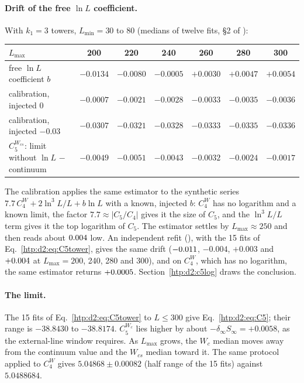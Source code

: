 \paragraph{Drift of the free $\ln L$ coefficient.} With $k_1=3$ towers, $L_{\min}=30$ to 80 (medians of twelve fits,
\S2 of ):
\begin{center}\footnotesize\renewcommand{\arraystretch}{1.15}
\begin{tabular}{@{}lcccccc@{}}
\toprule
$L_{\max}$ & 200 & 220 & 240 & 260 & 280 & 300 \\\midrule
free $\ln L$ coefficient $b$ & $-0.0134$ & $-0.0080$ & $-0.0005$ & $+0.0030$ & $+0.0047$ & $+0.0054$ \\
calibration, injected $0$ & $-0.0007$ & $-0.0021$ & $-0.0028$ & $-0.0033$ & $-0.0035$ & $-0.0036$ \\
calibration, injected $-0.03$ & $-0.0307$ & $-0.0321$ & $-0.0328$ & $-0.0333$ & $-0.0335$ & $-0.0336$ \\
$C_5^{W_{cs}}$: limit without $\ln L$ $-$ continuum & $-0.0049$ & $-0.0051$ & $-0.0043$ & $-0.0032$ & $-0.0024$ & $-0.0017$ \\
\bottomrule
\end{tabular}
\end{center}
The calibration applies the same estimator to the synthetic series $7.7\,C_4^W+2\ln^3L/L+b\ln L$ with a known, injected $b$:
$C_4^W$ has no logarithm and a known limit, the factor $7.7\approx|C_5/C_4|$ gives it the size of $C_5$, and the
$\ln^3L/L$ term gives it the top logarithm of $C_5$. The estimator settles by $L_{\max}\approx250$ and then reads about
$0.004$ low. An independent refit (), with the 15 fits of Eq.~\eqref{htp:d2:eq:C5tower}, gives the
same drift ($-0.011$, $-0.004$, $+0.003$ and
$+0.004$ at $L_{\max}=200$, 240, 280 and 300), and on $C_4^W$, which has no logarithm, the same estimator
returns $+0.0005$. Section~\ref{htp:d2:c5log} draws the conclusion.

\paragraph{The limit.} The 15 fits of Eq.~\eqref{htp:d2:eq:C5tower} to $L\le300$ give Eq.~\eqref{htp:d2:eq:C5}; their range is
$-38.8430$ to $-38.8174$. $C_5^{W_c}$ lies higher by about $-\delta_\infty S_\infty=+0.0058$, as the external-line window
requires. As $L_{\max}$ grows, the $W_c$ median moves away from the continuum value and the $W_{cs}$ median toward it. The
same protocol applied to $C_4^W$ gives $5.04868\pm0.00082$ (half range of the 15 fits) against $5.0488684$.

